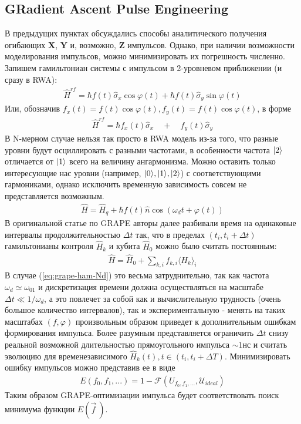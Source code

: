 \documentclass[12pt, twoside]{report}
\DeclarePairedDelimiter\ket{\lvert}{\rangle}
\numberwithin{equation}{section}
\numberwithin{figure}{section}
\begin{document}
\subsection{GRadient Ascent Pulse Engineering} \label{subsec:GRAPE}
В предыдущих пунктах обсуждались способы аналитического получения огибающих $\mathbf{X}$, $\mathbf{Y}$ и, возможно, $\mathbf{Z}$ импульсов. Однако, при наличии возможности моделирования импульсов, можно минимизировать их погрешность численно. Запишем гамильтониан системы с импульсом в 2-уровневом приближении (и сразу в RWA): 
\begin{gather*}
\hat{H}^{rf} =  \hbar f\left(t\right)\hat{\sigma}_x \cos\varphi\left(t\right) + \hbar f\left(t\right)\hat{\sigma}_y \sin\varphi\left(t\right) 
\end{gather*}
Или, обозначив $f_x\left(t\right) = f\left(t\right) \cos\varphi\left(t\right), f_y\left(t\right) = f\left(t\right) \cos\varphi\left(t\right)$, в форме 
\begin{gather*}
\hat{H}^{rf} = \hbar f_x\left(t\right)\hat{\sigma}_x \quad + \quad f_y\left(t\right)\hat{\sigma}_y
\end{gather*}
В N-мерном случае нельзя так просто в RWA модель из-за того, что разные уровни будут осциллировать с разными частотами, в особенности частота $\ket{2}$  отличается от $\ket{1}$ всего на величину ангармонизма. Можно оставить только интересующие нас уровни (например, $\ket{0},\ket{1},\ket{2}$) с соответствующими гармониками, однако исключить временную зависимость совсем не представляется возможным. 
\begin{gather}
\hat{H} = \hat{H}_q + \hbar f\left(t\right) \hat{n} \cos\left( \omega_d t + \varphi\left(t\right)\right)
\label{eq:grape-ham-Nd}
\end{gather}
В оригинальной статье по GRAPE \cite{KHANEJA2005296} авторы далее разбивали время на одинаковые интервалы продолжительностью $\Delta t$ так, что в пределах $\left(t_i, t_i + \Delta t\right)$ гамильтонианы  контроля $\hat{H}_k$ и кубита $\hat{H}_0$ можно было считать постоянным:
\begin{gather*}
\hat{H} = \hat{H}_0 + \sum_{k,i} f_{k,i} \langle{H}_k\rangle_i
\end{gather*}
В случае (\ref{eq:grape-ham-Nd}) это весьма затруднительно, так как частота $\omega_d \simeq \omega_{01}$ и дискретизация времени должна осуществляться на масштабе $\Delta t \ll 1/\omega_d$, а это повлечет за собой как и вычислительную трудность (очень большое количество интервалов), так и экспериментальную - менять на таких масштабах $(f, \varphi)$ произвольным образом приведет к дополнительным ошибкам формирования импульса. Более разумным представляется ограничить $\Delta t$ снизу реальной возможной длительностью прямоугольного импульса  $\sim 1нс$ и считать эволюцию для временезависимого $\hat{H}_k\left(t\right), t \in \left(t_i, t_i + \Delta T\right)$. Минимизировать ошибку импульсов можно представив ее в виде 
\begin{gather*}
E\left(f_0, f_1, ... \right) = 1 - \mathcal{F}\left(U_{f_0,f_1, ...}, \mathcal{U}_{ideal}\right)
\end{gather*}
Таким образом GRAPE-оптимизации импульса будет соответствовать поиск минимума функции $E\left(\vec{f}~\right)$.
\end{document}
